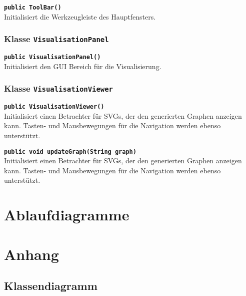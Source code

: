 \documentclass[parskip=full,11pt,twoside]{scrartcl}
\begin{document}
\textbf{\texttt{public ToolBar()}}\\
Initialisiert die Werkzeugleiste des Hauptfensters.

\subsubsection{Klasse \texttt{VisualisationPanel}}

\textbf{\texttt{public VisualisationPanel()}}\\
Initialisiert den GUI Bereich für die Visualisierung.

\subsubsection{Klasse \texttt{VisualisationViewer}}

\textbf{\texttt{public VisualisationViewer()}}\\
Initialisiert einen Betrachter für SVGs, der den generierten Graphen anzeigen kann. Tasten- und Mausbewegungen für die Navigation werden ebenso unterstützt.

\textbf{\texttt{public void updateGraph(String graph)}}\\
Initialisiert einen Betrachter für SVGs, der den generierten Graphen anzeigen kann. Tasten- und Mausbewegungen für die Navigation werden ebenso unterstützt.

\section{Ablaufdiagramme}

\appendix

\section{Anhang}

\subsection{Klassendiagramm}
\end{document}
